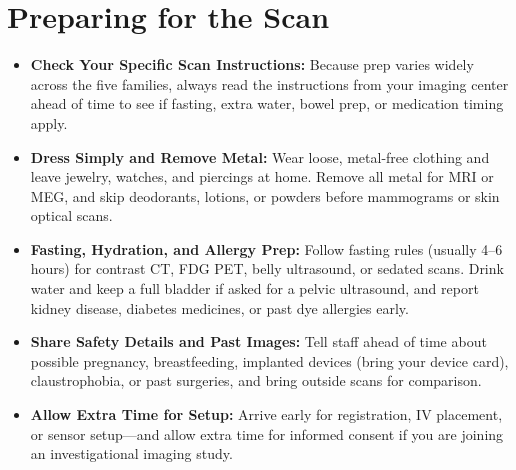 \section{Preparing for the Scan}
\begin{itemize}
  \item \textbf{Check Your Specific Scan Instructions:} Because prep varies widely across the five families, always read the instructions from your imaging center ahead of time to see if fasting, extra water, bowel prep, or medication timing apply.
  \item \textbf{Dress Simply and Remove Metal:} Wear loose, metal-free clothing and leave jewelry, watches, and piercings at home. Remove all metal for MRI or MEG, and skip deodorants, lotions, or powders before mammograms or skin optical scans.
  \item \textbf{Fasting, Hydration, and Allergy Prep:} Follow fasting rules (usually 4--6 hours) for contrast CT, FDG PET, belly ultrasound, or sedated scans. Drink water and keep a full bladder if asked for a pelvic ultrasound, and report kidney disease, diabetes medicines, or past dye allergies early.
  \item \textbf{Share Safety Details and Past Images:} Tell staff ahead of time about possible pregnancy, breastfeeding, implanted devices (bring your device card), claustrophobia, or past surgeries, and bring outside scans for comparison.
  \item \textbf{Allow Extra Time for Setup:} Arrive early for registration, IV placement, or sensor setup---and allow extra time for informed consent if you are joining an investigational imaging study.
\end{itemize}

